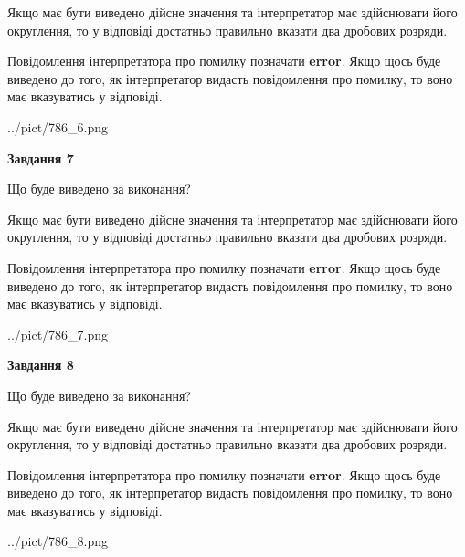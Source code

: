 \documentclass[12pt, ukrainian]{article}
\begin{document}
{\begin {Large}
Якщо має бути виведено дійсне значення та інтерпретатор має здійснювати його округлення, 
то у відповіді достатньо правильно вказати два дробових розряди.

Повідомлення інтерпретатора про помилку позначати \textbf{error}.
Якщо щось буде виведено до того, як інтерпретатор видасть повідомлення про помилку, 
то воно має вказуватись у відповіді. \par

\begin{center}
	{../pict/786_6.png}
\end{center}
\newpage

{\begin {center}\textbf{Завдання 7}\end {center}}\par
Що буде виведено за виконання? \par

Якщо має бути виведено дійсне значення та інтерпретатор має здійснювати його округлення, 
то у відповіді достатньо правильно вказати два дробових розряди.

Повідомлення інтерпретатора про помилку позначати \textbf{error}.
Якщо щось буде виведено до того, як інтерпретатор видасть повідомлення про помилку, 
то воно має вказуватись у відповіді. \par

\begin{center}
	{../pict/786_7.png}
\end{center}
\newpage

{\begin {center}\textbf{Завдання 8}\end {center}}\par
Що буде виведено за виконання? \par

Якщо має бути виведено дійсне значення та інтерпретатор має здійснювати його округлення, 
то у відповіді достатньо правильно вказати два дробових розряди.

Повідомлення інтерпретатора про помилку позначати \textbf{error}.
Якщо щось буде виведено до того, як інтерпретатор видасть повідомлення про помилку, 
то воно має вказуватись у відповіді. \par

\begin{center}
	{../pict/786_8.png}
\end{center}
\newpage


\end{Large}}
\end{document}
